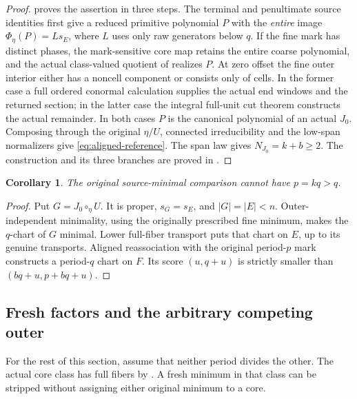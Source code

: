 \documentclass[11pt,a4paper]{amsart}
\numberwithin{equation}{section}
\theoremstyle{plain}
\newtheorem{corollary}[theorem]{Corollary}
\theoremstyle{definition}
\begin{document}
\begin{proof}
 proves the assertion in three steps.  The terminal and
penultimate source identities first give a reduced primitive polynomial \(P\)
with the \emph{entire} image \(\Phi_\eta(P)=L s_E\), where \(L\) uses only
raw generators below \(q\).  If the fine mark has distinct phases, the
mark-sensitive core map retains the entire coarse polynomial, and the
actual class-valued quotient of  realizes \(P\).
At zero offset the fine outer interior either has a noncell component or
consists only of cells.  In the former case a full ordered conormal
calculation supplies the actual end windows and the returned section;
in the latter case the integral full-unit cut theorem constructs the
actual remainder.  In both cases \(P\) is the canonical polynomial of an
actual \(J_0\).  Composing through the original \(\eta/U\), connected
irreducibility and the low-span normalizers give \eqref{eq:aligned-reference}.
The span law gives \(N_{J_0}=k+b\ge2\).  The construction and its three
branches are proved in .
\end{proof}

\begin{corollary}\label{cor:integer-exit}
The original source-minimal comparison cannot have \(p=kq>q\).
\end{corollary}
\begin{proof}
Put \(G=J_0\circ_\eta U\).  It is proper, \(s_G=s_E\), and
\(|G|=|E|<n\).  Outer-independent minimality, using the originally prescribed
fine minimum, makes the \(q\)-chart of \(G\) minimal.  Lower full-fiber transport
puts that chart on \(E\), up to its genuine transports.  Aligned
reassociation with the original period-\(p\) mark constructs a period-\(q\)
chart on \(F\).  Its score \((u,q+u)\) is strictly smaller than
\((bq+u,p+bq+u)\).
\end{proof}

\subsection{Fresh factors and the arbitrary competing outer}

For the rest of this section, assume that neither period divides the other.
The actual core class has full fibers by .  A fresh
minimum in that class can be stripped without assigning either original
minimum to a core.
\end{document}
